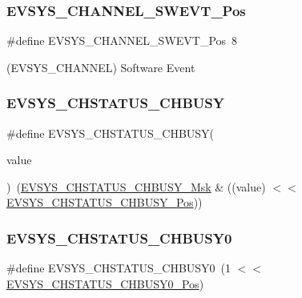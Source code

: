 \subsubsection{\texorpdfstring{EVSYS\_CHANNEL\_SWEVT\_Pos}{EVSYS\_CHANNEL\_SWEVT\_Pos}}
{\footnotesize\ttfamily \#define E\+V\+S\+Y\+S\+\_\+\+C\+H\+A\+N\+N\+E\+L\+\_\+\+S\+W\+E\+V\+T\+\_\+\+Pos~8}



(E\+V\+S\+Y\+S\+\_\+\+C\+H\+A\+N\+N\+EL) Software Event 

\mbox{\label{group___s_a_m_d21___e_v_s_y_s_ga1ec9f87254248d2d1b4e567644d57c7f}} 
\subsubsection{\texorpdfstring{EVSYS\_CHSTATUS\_CHBUSY}{EVSYS\_CHSTATUS\_CHBUSY}}
{\footnotesize\ttfamily \#define E\+V\+S\+Y\+S\+\_\+\+C\+H\+S\+T\+A\+T\+U\+S\+\_\+\+C\+H\+B\+U\+SY(\begin{DoxyParamCaption}\item[{}]{value }\end{DoxyParamCaption})~(\mbox{\hyperlink{group___s_a_m_d21___e_v_s_y_s_ga7bce985535fe381445bb8a5cf1f2399b}{E\+V\+S\+Y\+S\+\_\+\+C\+H\+S\+T\+A\+T\+U\+S\+\_\+\+C\+H\+B\+U\+S\+Y\+\_\+\+Msk}} \& ((value) $<$$<$ \mbox{\hyperlink{group___s_a_m_d21___e_v_s_y_s_gaf934c39253522ee2b09adf3b8a61ab8b}{E\+V\+S\+Y\+S\+\_\+\+C\+H\+S\+T\+A\+T\+U\+S\+\_\+\+C\+H\+B\+U\+S\+Y\+\_\+\+Pos}}))}

\mbox{\label{group___s_a_m_d21___e_v_s_y_s_gac40089b08c0ecca849d9125b1461b6e3}} 
\subsubsection{\texorpdfstring{EVSYS\_CHSTATUS\_CHBUSY0}{EVSYS\_CHSTATUS\_CHBUSY0}}
{\footnotesize\ttfamily \#define E\+V\+S\+Y\+S\+\_\+\+C\+H\+S\+T\+A\+T\+U\+S\+\_\+\+C\+H\+B\+U\+S\+Y0~(1 $<$$<$ \mbox{\hyperlink{group___s_a_m_d21___e_v_s_y_s_ga9a10f270ab54c11a0b74eddf263dd36b}{E\+V\+S\+Y\+S\+\_\+\+C\+H\+S\+T\+A\+T\+U\+S\+\_\+\+C\+H\+B\+U\+S\+Y0\+\_\+\+Pos}})}

